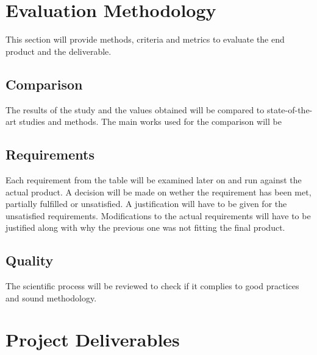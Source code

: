 
\section{Evaluation Methodology}

This section will provide methods, criteria and metrics to evaluate the end product and the deliverable.


\subsection{Comparison}

The results of the study and the values obtained will be compared to state-of-the-art studies and methods. The main works used for the comparison will be \cite{}


\subsection{Requirements}

Each requirement from the table will be examined later on and run against the actual product. A decision will be made on wether the requirement has been met, partially fulfilled or unsatisfied. A justification will have to be given for the unsatisfied requirements. Modifications to the actual requirements will have to be justified along with why the previous one was not fitting the final product.


\subsection{Quality}

The scientific process will be reviewed to check if it complies to good practices and sound methodology. 


\section{Project Deliverables}

